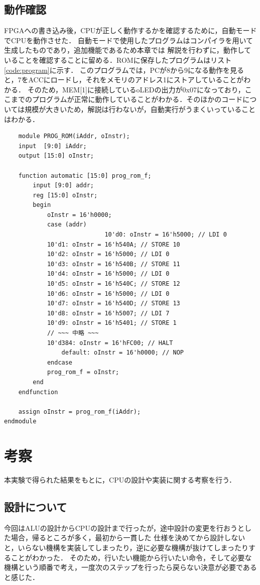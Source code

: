 \documentclass[a4paper,11pt]{ltjsarticle}
\begin{document}
\subsection{動作確認}
FPGAへの書き込み後，CPUが正しく動作するかを確認するために，自動モードでCPUを動作させた．
自動モードで使用したプログラムはコンパイラを用いて生成したものであり，追加機能であるため本章では
解説を行わずに，動作していることを確認することに留める．ROMに保存したプログラムはリスト\ref{code:program}に示す．
このプログラムでは，PCが8から9になる動作を見ると，7をACCにロードし，それをメモリのアドレス1にストアしていることがわかる．
そのため，MEM[1]に接続しているoLEDの出力が0x07になっており，ここまでのプログラムが正常に動作していることがわかる．そのほかのコードについては規模が大きいため，解説は行わないが，自動実行がうまくいっていることはわかる．
\begin{lstlisting}
    module PROG_ROM(iAddr, oInstr);
    input  [9:0] iAddr;
    output [15:0] oInstr;

    function automatic [15:0] prog_rom_f;
        input [9:0] addr;
        reg [15:0] oInstr;
        begin
            oInstr = 16'h0000;
            case (addr)
                            10'd0: oInstr = 16'h5000; // LDI 0
            10'd1: oInstr = 16'h540A; // STORE 10
            10'd2: oInstr = 16'h5000; // LDI 0
            10'd3: oInstr = 16'h540B; // STORE 11
            10'd4: oInstr = 16'h5000; // LDI 0
            10'd5: oInstr = 16'h540C; // STORE 12
            10'd6: oInstr = 16'h5000; // LDI 0
            10'd7: oInstr = 16'h540D; // STORE 13
            10'd8: oInstr = 16'h5007; // LDI 7
            10'd9: oInstr = 16'h5401; // STORE 1
            // ~~~ 中略 ~~~
            10'd384: oInstr = 16'hFC00; // HALT
                default: oInstr = 16'h0000; // NOP
            endcase
            prog_rom_f = oInstr;
        end
    endfunction

    assign oInstr = prog_rom_f(iAddr);
endmodule
\end{lstlisting}
\section{考察}
本実験で得られた結果をもとに，CPUの設計や実装に関する考察を行う．
\subsection{設計について}
今回はALUの設計からCPUの設計まで行ったが，途中設計の変更を行おうとした場合，帰るところが多く，最初から一貫した
仕様を決めてから設計しないと，いらない機構を実装してしまったり，逆に必要な機構が抜けてしまったりすることがわかった．
そのため，行いたい機能から行いたい命令，そして必要な機構という順番で考え，一度次のステップを行ったら戻らない決意が必要であると感じた．
\end{document}
